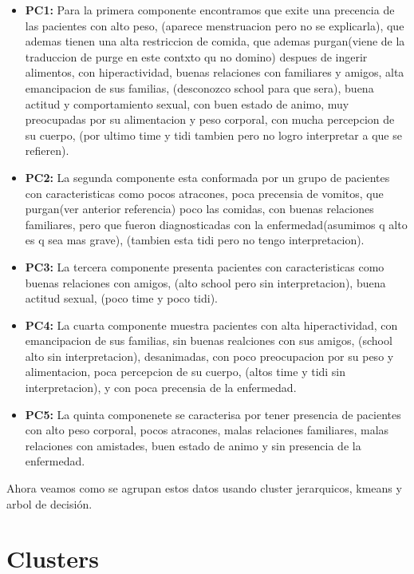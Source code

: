 \documentclass[a4paper,10pt,twocolumn]{article}
\begin{document}
\begin{itemize}
	\item \textbf{PC1:} Para la primera componente encontramos que exite una precencia de las pacientes con alto peso, (aparece menstruacion pero no se explicarla), que ademas tienen una alta restriccion de comida, que ademas purgan(viene de la traduccion de purge en este contxto qu no domino) despues de ingerir alimentos, con hiperactividad, buenas relaciones con familiares y amigos, alta emancipacion de sus familias, (desconozco school para que sera), buena actitud y comportamiento sexual, con buen estado de animo, muy preocupadas por su alimentacion y peso corporal, con mucha percepcion de su cuerpo, (por ultimo time y tidi tambien pero no logro interpretar a que se refieren).
	
	\item \textbf{PC2:} La segunda componente esta conformada por un grupo de pacientes con caracteristicas como pocos atracones, poca precensia de vomitos, que purgan(ver anterior referencia) poco las comidas, con buenas relaciones familiares, pero que fueron diagnosticadas con la enfermedad(asumimos q alto es q sea mas grave), (tambien esta tidi pero no tengo interpretacion).
	
	\item \textbf{PC3:} La tercera componente presenta pacientes con caracteristicas como buenas relaciones con amigos, (alto school pero sin interpretacion), buena actitud sexual, (poco time y poco tidi).
	
	\item \textbf{PC4:} La cuarta componente muestra pacientes con alta hiperactividad, con emancipacion de sus familias, sin buenas realciones con sus amigos, (school alto sin interpretacion), desanimadas, con poco preocupacion por su peso y alimentacion, poca percepcion de su cuerpo, (altos time y tidi sin interpretacion), y con poca precensia de la enfermedad.
	
	\item \textbf{PC5:} La quinta componenete se caracterisa por tener presencia de pacientes con alto peso corporal, pocos atracones, malas relaciones familiares, malas relaciones con amistades, buen estado de animo y sin presencia de la enfermedad.
\end{itemize}

Ahora veamos como se agrupan estos datos usando cluster jerarquicos, kmeans y arbol de decisión.

\section{Clusters}\label{sec:clusters}
\end{document}

